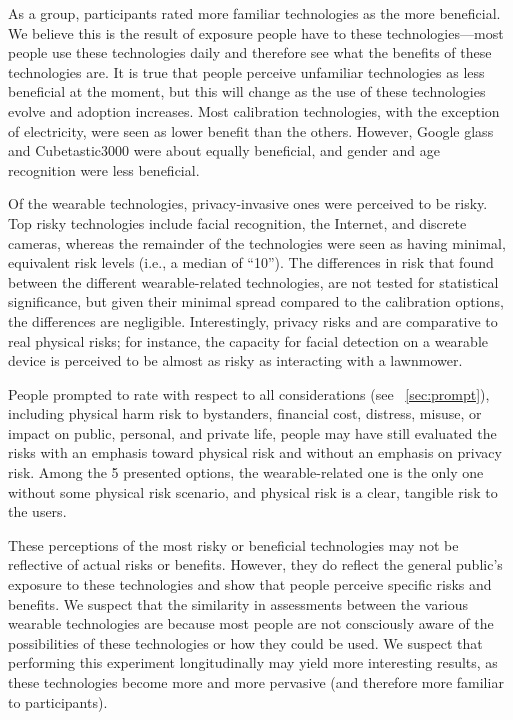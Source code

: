 As a group, participants rated more familiar technologies as the more beneficial. We believe this is the result of exposure people have to these technologies---most people use these technologies daily and therefore see what the benefits of these technologies are. It is true that people perceive unfamiliar technologies as less beneficial at the moment, but this will change as the use of these technologies evolve and adoption increases. Most calibration technologies, with the exception of electricity, were seen as lower benefit than the others. However, Google glass and Cubetastic3000 were about equally beneficial, and gender and age recognition were less beneficial. 

Of the wearable technologies, privacy-invasive ones were perceived to be risky. Top risky technologies include facial recognition, the Internet, and discrete cameras, whereas the remainder of the technologies were seen as having minimal,  equivalent risk levels (i.e., a median of ``10''). The differences in risk that found between the different wearable-related technologies, are not tested for statistical significance, but given their minimal spread compared to the calibration options, the differences are negligible. Interestingly, privacy risks and are comparative to real physical risks; for instance, the capacity for facial detection on a wearable device is perceived to be almost as risky as interacting with a lawnmower. 

People prompted to rate with respect to all considerations (see ~\ref{sec:prompt}), including physical harm risk to bystanders, financial cost, distress, misuse, or impact on public, personal, and private life, people may have still evaluated the risks with an emphasis toward physical risk and without an emphasis on privacy risk. Among the 5 presented options, the wearable-related one is the only one without some physical risk scenario, and physical risk is a clear, tangible risk to the users. 

These perceptions of the most risky or beneficial technologies may not be reflective of actual risks or benefits. However, they do reflect the general public's exposure to these technologies and show that people perceive specific risks and benefits. We suspect that the similarity in assessments between the various wearable technologies are because most people are not consciously aware of the possibilities of these technologies or how they could be used. We suspect that performing this experiment longitudinally may yield more interesting results, as these technologies become more and more pervasive (and therefore more familiar to participants).
